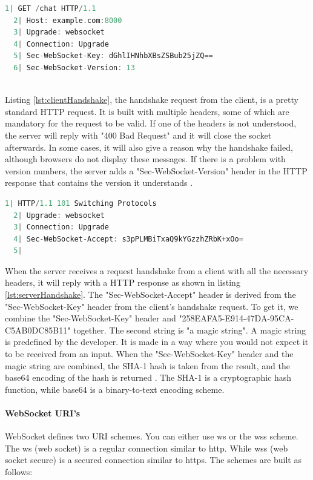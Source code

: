 \documentclass[a4paper, 11pt]{report}
\begin{document}
	\begin{lstlisting}[caption={Client's request for WebSocket handshake},captionpos=b, label={lst:clientHandshake}, language=c, float=h]
  1| GET /chat HTTP/1.1
  2| Host: example.com:8000
  3| Upgrade: websocket
  4| Connection: Upgrade
  5| Sec-WebSocket-Key: dGhlIHNhbXBsZSBub25jZQ==
  6| Sec-WebSocket-Version: 13
	\end{lstlisting}\\
Listing \ref{lst:clientHandshake}, the handshake request from the client, is a pretty standard HTTP request. It is built with multiple headers, some of which are mandatory for the request to be valid. If one of the headers is not understood, the server will reply with "400 Bad Request" and it will close the socket afterwards. In some cases, it will also give a reason why the handshake failed, although browsers do not display these messages. If there is a problem with version numbers, the server adds a "Sec-WebSocket-Version" header in the HTTP response that contains the version it understands \cite{BadRequest}.
	\begin{lstlisting}[caption={Server's response for WebSocket handshake},captionpos=b, label={lst:serverHandshake}, language=c, float=h]
  1| HTTP/1.1 101 Switching Protocols
  2| Upgrade: websocket
  3| Connection: Upgrade
  4| Sec-WebSocket-Accept: s3pPLMBiTxaQ9kYGzzhZRbK+xOo=
  5|
	\end{lstlisting}
When the server receives a request handshake from a client with all the necessary headers, it will reply with a HTTP response as shown in listing \ref{lst:serverHandshake}. The "Sec-WebSocket-Accept" header is derived from the "Sec-WebSocket-Key" header from the client's handshake request. To get it, we combine the "Sec-WebSocket-Key" header and "258EAFA5-E914-47DA-95CA-C5AB0DC85B11" together. The second string is "a magic string". A magic string is predefined by the developer. It is made in a way where you would not expect it to be received from an input. When the "Sec-WebSocket-Key" header and the magic string are combined, the SHA-1 hash is taken from the result, and the base64 encoding of the hash is returned \cite{BadRequest}. The SHA-1 is a cryptographic hash function, while base64 is a binary-to-text encoding scheme.

		\paragraph{WebSocket URI's}
WebSocket defines two URI schemes. You can either use ws or the wss scheme. The ws (web socket) is a regular connection similar to http. While wss (web socket secure) is a secured connection similar to https. The schemes are built as follows:\\
\end{document}
